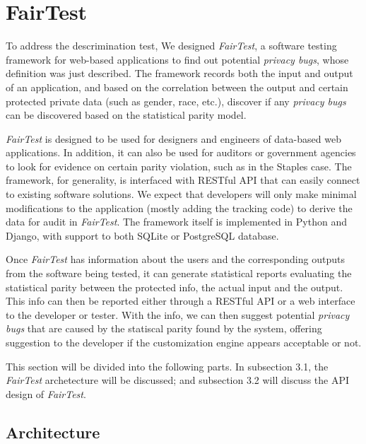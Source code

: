 \section{FairTest}
\label{sect:fairtest}


To address the descrimination test, We designed \textit{FairTest}, a software
testing framework for web-based applications to find out potential
\textit{privacy bugs}, whose definition was just described. The framework
records both the input and output of an application, and based on the
correlation between the output and certain protected private data (such as
gender, race, etc.), discover if any \textit{privacy bugs} can be discovered 
based on the statistical parity model.


\textit{FairTest} is designed to be used for designers and engineers of 
data-based web applications. In addition, it can also be used for auditors 
or government agencies to look for evidence on certain parity violation,
such as in the Staples case. The framework, for generality, is interfaced 
with RESTful API that can easily connect to existing software solutions.
We expect that developers will only make minimal modifications to the
application (mostly adding the tracking code) to derive the data for audit
in \textit{FairTest}. The framework itself is implemented in Python and
Django, with support to both SQLite or PostgreSQL database.


Once \textit{FairTest} has information about the users and the corresponding
outputs from the software being tested, it can generate statistical reports
evaluating the statistical parity between the protected info, the actual
input and the output. This info can then be reported either through a RESTful
API or a web interface to the developer or tester. With the info, we can then
suggest potential \textit{privacy bugs} that are caused by the statiscal
parity found by the system, offering suggestion to the developer if the
customization engine appears acceptable or not.


This section will be divided into the following parts. In subsection 3.1, the
\textit{FairTest} archetecture will be discussed; and subsection 3.2 will
discuss the API design of \textit{FairTest}. 

\subsection{Architecture}

